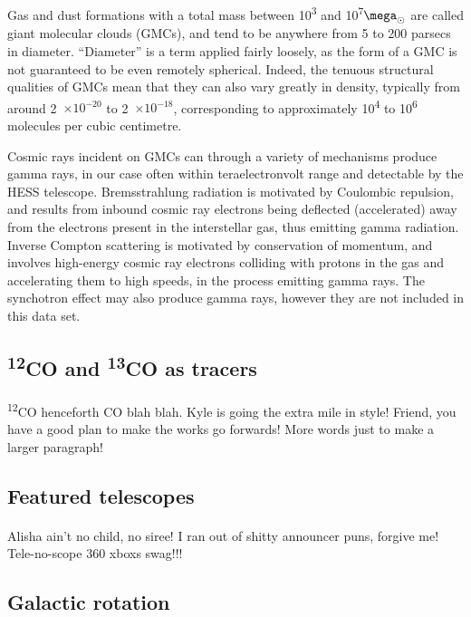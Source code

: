 \documentclass[a4paper, titlepage, oneside]{article}
\newcommand{\elem}[2]{\textsuperscript{#1}{#2}}
\newcommand{\e}[1]{\ensuremath{\times 10^{#1}}}
\newcommand{\smass}{\ensuremath{\mega_\odot}} %
\begin{document}
\begin{multicols}{2}
Gas and dust formations with a total mass between \unit{10^3} and \unit{10^7}{\smass} are called giant molecular clouds (GMCs), and tend to be anywhere from 5 to 200 parsecs in diameter. \parencite{apj1} ``Diameter'' is a term applied fairly loosely, as the form of a GMC is not guaranteed to be even remotely spherical. Indeed, the tenuous structural qualities of GMCs mean that they can also vary greatly in density, typically from around \unit{2\e{-20}} to \unit{2\e{-18}}{\gram\usk\centi\metre\rpcubed}, corresponding to approximately \unit{10^4} to \unit{10^6} molecules per cubic centimetre. \parencite{rmp1}

Cosmic rays incident on GMCs can through a variety of mechanisms produce gamma rays, in our case often within teraelectronvolt range and detectable by the HESS telescope. Bremsstrahlung radiation is motivated by Coulombic repulsion, and results from inbound cosmic ray electrons being deflected (accelerated) away from the electrons present in the interstellar gas, thus emitting gamma radiation. Inverse Compton scattering is motivated by conservation of momentum, and involves high-energy cosmic ray electrons colliding with protons in the gas and accelerating them to high speeds, in the process emitting gamma rays. \parencite{rmp1} The synchotron effect may also produce gamma rays, however they are not included in this data set.

\subsection{\elem{12}{CO} and \elem{13}{CO} as tracers}
\paragraph{}
\elem{12}{CO} henceforth CO blah blah. Kyle is going the extra mile in style! Friend, you have a good plan to make the works go forwards! More words just to make a larger paragraph!

\subsection{Featured telescopes}
\paragraph{}
Alisha ain't no child, no siree! I ran out of shitty announcer puns, forgive me! Tele-no-scope 360 xboxs swag!!!

\subsection{Galactic rotation}

\end{multicols}
\end{document}
